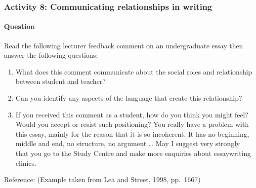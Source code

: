 \documentclass[letterpaper,10pt,english]{sphinxmanual}
\begin{document}
\subsubsection{Activity 8: Communicating relationships in writing}
\label{\detokenize{content/session_00/Part_00_04:Activity-8:-Communicating-relationships-in-writing}}


\paragraph{Question}
\label{\detokenize{content/session_00/Part_00_04:Question}}
Read the following lecturer feedback comment on an undergraduate essay then answer the following questions:
\begin{enumerate}
%
\item {} 
What does this comment communicate about the social roles and relationship between student and teacher?

\item {} 
Can you identify any aspects of the language that create this relationship?

\item {} 
If you received this comment as a student, how do you think you might feel? Would you accept or resist such positioning? You really have a problem with this essay, mainly for the reason that it is so incoherent. It has no beginning, middle and end, no structure, no argument … May I suggest very strongly that you go to the Study Centre and make more enquiries about essay\sphinxhyphen{}writing clinics.

\end{enumerate}

Reference: (Example taken from Lea and Street, 1998, pp. 166\textendash{}7)
\end{document}
